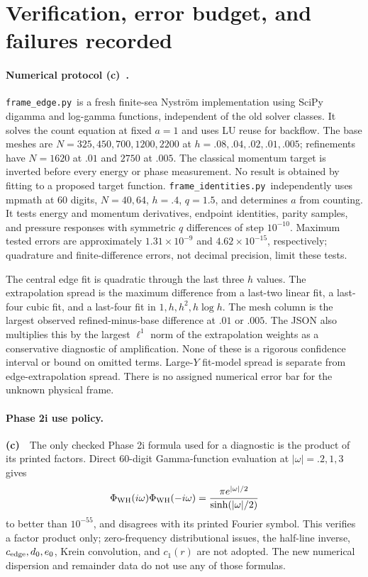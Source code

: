\documentclass[11pt,a4paper]{article}
\newcommand{\Lc}{\textbf{(c)}\ }
\newcommand{\id}{\texttt{frame\_\allowbreak identities.py}}
\newcommand{\ed}{\texttt{frame\_\allowbreak edge.py}}
\begin{document}
\section{Verification, error budget, and failures recorded}
\paragraph{Numerical protocol \Lc.}
\ed\ is a fresh finite-sea Nystr\"om implementation using SciPy digamma and
log-gamma functions, independent of the old solver classes. It solves the
count equation at fixed $a=1$ and uses LU reuse for backflow. The base meshes
are $N=325,450,700,1200,2200$ at $h=.08,.04,.02,.01,.005$;
refinements have $N=1620$ at $.01$ and $2750$ at $.005$.
The classical momentum target is inverted before every energy or phase
measurement. No result is obtained by fitting to a proposed target function.
\id\ independently uses mpmath at 60 digits, $N=40,64$, $h=.4$, $q=1.5$,
and determines $a$ from counting. It tests energy and momentum derivatives,
endpoint identities, parity samples, and pressure responses with symmetric
$q$ differences of step $10^{-10}$. Maximum tested errors are approximately
$1.31\times10^{-9}$ and $4.62\times10^{-15}$, respectively; quadrature and
finite-difference errors, not decimal precision, limit these tests.

The central edge fit is quadratic through the last three $h$ values.
The extrapolation spread is the maximum difference from a last-two linear
fit, a last-four cubic fit, and a last-four fit in $1,h,h^2,h\log h$.
The mesh column is the largest observed refined-minus-base difference at
$.01$ or $.005$. The JSON also multiplies this by the largest $\ell^1$
norm of the extrapolation weights as a conservative diagnostic of amplification.
None of these is a rigorous confidence interval or bound on omitted terms.
Large-$Y$ fit-model spread is separate from edge-extrapolation spread.
There is no assigned numerical error bar for the unknown physical frame.

\paragraph{Phase 2i use policy.}
\Lc\ The only checked Phase 2i formula used for a diagnostic is the product
of its printed factors. Direct 60-digit Gamma-function evaluation at
$|\omega|=.2,1,3$ gives
\begin{equation}
 \Phi_{\rm WH}(i\omega)\Phi_{\rm WH}(-i\omega)
 =\frac{\pi e^{|\omega|/2}}{\sinh(|\omega|/2)}
\end{equation}
to better than $10^{-55}$, and disagrees with its printed Fourier symbol.
This verifies a factor product only; zero-frequency distributional issues,
the half-line inverse, $c_{\rm edge},d_0,e_0$, Krein convolution, and $c_1(r)$
are not adopted. The new numerical dispersion and remainder data do not use
any of those formulas.
\end{document}
